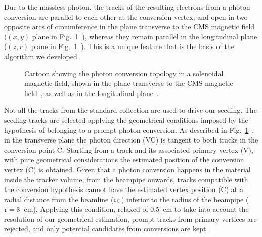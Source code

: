 \documentclass[a4paper]{jpconf}
\begin{document}
Due to the massless photon, the tracks of the resulting electrons from a photon conversion are parallel to each other at the conversion vertex, and open in two opposite arcs of circumference in the  plane transverse to the CMS magnetic field ($(x,y)$ plane in Fig.~\ref{fig:algo}~),
whereas they  remain parallel in the  longitudinal plane ($(z,r)$ plane in Fig.~\ref{fig:algo}~). This is a unique feature that is the basis of the algorithm we developed. 


\begin{figure}[]
\centering
{}
\caption{Cartoon showing the photon conversion topology in a solenoidal magnetic field,
shown in the plane transverse  to the CMS magnetic field~, as well as  in the longitudinal plane~.}

\label{fig:algo}
\end{figure}

Not all the tracks from  the standard collection are used to drive our seeding. The seeding tracks are selected applying the geometrical conditions imposed by the hypothesis of belonging to a prompt-photon conversion. 
%
As described in Fig.~\ref{fig:algo}~, in the transverse plane the photon direction (VC) is tangent to both tracks in the conversion point C. Starting from a track and its associated primary vertex (V), with pure geometrical considerations the estimated position of the conversion vertex (C) is obtained. Given that a photon conversion happens in the material inside the tracker volume, from the beampipe onwards, tracks compatible with the conversion hypothesis cannot have the estimated vertex position (C) at a radial distance from the beamline ($\rm r_C$) inferior to the radius of the beampipe ($\rm r=3$~cm). Applying this condition, relaxed of 0.5~cm to take into account the resolution of our geometrical estimation,  prompt tracks from primary vertices are rejected, and only potential candidates from conversions are kept.
\end{document}
